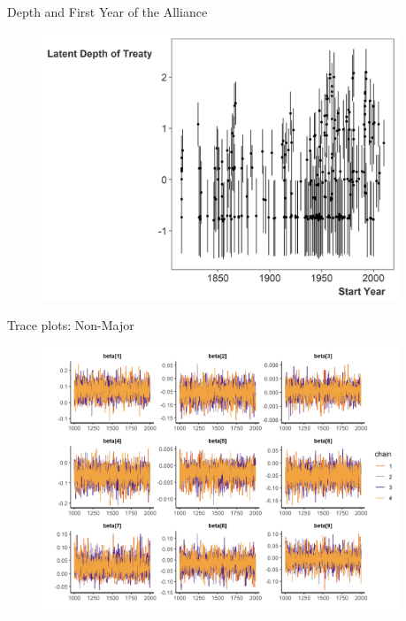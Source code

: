 \documentclass[12pt]{beamer}
\begin{document}

\begin{frame}{Depth and First Year of the Alliance}

\begin{figure}
	\centering
		\includegraphics[width=0.95\textwidth]{ld-start-year.png}
\end{figure}


\end{frame}




\begin{frame}{Trace plots: Non-Major}

\begin{figure}
	\centering
		\includegraphics[width=0.95\textwidth]{beta-trace-maj.png}
\end{figure}


\end{frame}
\end{document}
